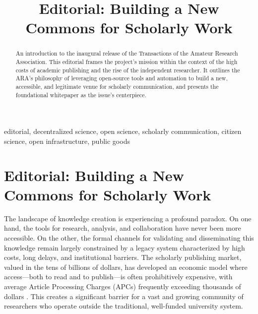 \documentclass[conference, compsoc, 11pt]{IEEEtran}
\title{Editorial: Building a New Commons for Scholarly Work}
\author{
    \IEEEauthorblockN{Ivan Anishchuk}
    \IEEEauthorblockA{
        ivan@ivananishchuk.net https://ivananishchuk.work \\
	ORCID \orcidicon{0009-0008-8729-6137}: 0009-0008-8729-6137 %
    }
}
\begin{document}
\IEEEoverridecommandlockouts
{}

\maketitle

\IEEEpubidadjcol

\begin{abstract}
An introduction to the inaugural release of the Transactions of the Amateur Research Association. This editorial frames the project's mission within the context of the high costs of academic publishing and the rise of the independent researcher. It outlines the ARA's philosophy of leveraging open-source tools and automation to build a new, accessible, and legitimate venue for scholarly communication, and presents the foundational whitepaper as the issue's centerpiece.
\end{abstract}

\begin{IEEEkeywords}
editorial, decentralized science, open science, scholarly communication, citizen science, open infrastructure, public goods
\end{IEEEkeywords}

\section*{Editorial: Building a New Commons for Scholarly Work}

The landscape of knowledge creation is experiencing a profound paradox. On one hand, the tools for research, analysis, and collaboration have never been more accessible. On the other, the formal channels for validating and disseminating this knowledge remain largely constrained by a legacy system characterized by high costs, long delays, and institutional barriers. The scholarly publishing market, valued in the tens of billions of dollars, has developed an economic model where access—both to read and to publish—is often prohibitively expensive, with average Article Processing Charges (APCs) frequently exceeding thousands of dollars \cite{solomon2016}. This creates a significant barrier for a vast and growing community of researchers who operate outside the traditional, well-funded university system.
\end{document}
